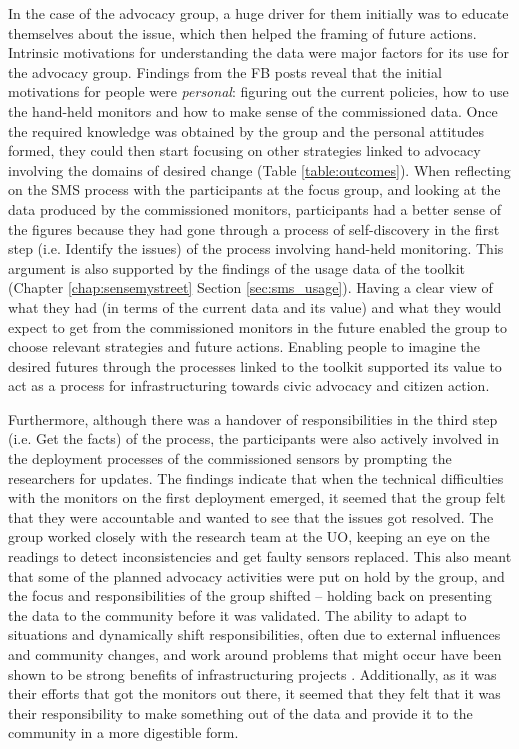 In the case of the advocacy group, a huge driver for them initially was to educate themselves about the issue, which then helped the framing of future actions. Intrinsic motivations for understanding the data were major factors for its use for the advocacy group. Findings from the FB posts reveal that the initial motivations for people were \textit{personal}: figuring out the current policies, how to use the hand-held monitors and how to make sense of the commissioned data. Once the required knowledge was obtained by the group and the personal attitudes formed, they could then start focusing on other strategies linked to advocacy involving the domains of desired change (Table \ref{table:outcomes}). When reflecting on the SMS process with the participants at the focus group, and looking at the data produced by the commissioned monitors, participants had a better sense of the figures because they had gone through a process of self-discovery in the first step (i.e. Identify the issues) of the process involving hand-held monitoring. This argument is also supported by the findings of the usage data of the toolkit (Chapter \ref{chap:sensemystreet} Section \ref{sec:sms_usage}). Having a clear view of what they had (in terms of the current data and its value) and what they would expect to get from the commissioned monitors in the future enabled the group to choose relevant strategies and future actions. Enabling people to imagine the desired futures through the processes linked to the toolkit supported its value to act as a process for infrastructuring \citep{dantec_infrastructuring_2013} towards civic advocacy and citizen action.

Furthermore, although there was a handover of responsibilities in the third step (i.e. Get the facts) of the process, the participants were also actively involved in the deployment processes of the commissioned sensors by prompting the researchers for updates. The findings indicate that when the technical difficulties with the monitors on the first deployment emerged, it seemed that the group felt that they were accountable and wanted to see that the issues got resolved. The group worked closely with the research team at the UO, keeping an eye on the readings to detect inconsistencies and get faulty sensors replaced. This also meant that some of the planned advocacy activities were put on hold by the group, and the focus and responsibilities of the group shifted -- holding back on presenting the data to the community before it was validated. The ability to adapt to situations and dynamically shift responsibilities, often due to external influences and community changes, and work around problems that might occur have been shown to be strong benefits of infrastructuring projects \citep{dantec_infrastructuring_2013}. Additionally, as it was their efforts that got the monitors out there, it seemed that they felt that it was their responsibility to make something out of the data and provide it to the community in a more digestible form.

